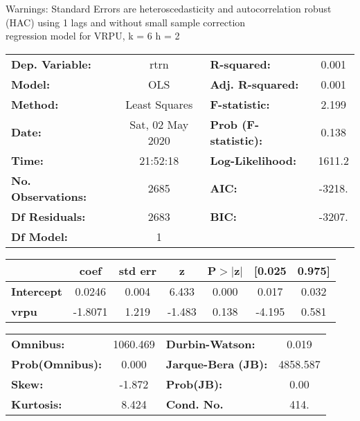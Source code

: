 Warnings: \newline
 [1] Standard Errors are heteroscedasticity and autocorrelation robust (HAC) using 1 lags and without small sample correction\\ 

regression model for VRPU, k = 6 h = 2\begin{center}
\begin{tabular}{lclc}
\toprule
\textbf{Dep. Variable:}    &       rtrn       & \textbf{  R-squared:         } &     0.001   \\
\textbf{Model:}            &       OLS        & \textbf{  Adj. R-squared:    } &     0.001   \\
\textbf{Method:}           &  Least Squares   & \textbf{  F-statistic:       } &     2.199   \\
\textbf{Date:}             & Sat, 02 May 2020 & \textbf{  Prob (F-statistic):} &    0.138    \\
\textbf{Time:}             &     21:52:18     & \textbf{  Log-Likelihood:    } &    1611.2   \\
\textbf{No. Observations:} &        2685      & \textbf{  AIC:               } &    -3218.   \\
\textbf{Df Residuals:}     &        2683      & \textbf{  BIC:               } &    -3207.   \\
\textbf{Df Model:}         &           1      & \textbf{                     } &             \\
\bottomrule
\end{tabular}
\begin{tabular}{lcccccc}
                   & \textbf{coef} & \textbf{std err} & \textbf{z} & \textbf{P$> |$z$|$} & \textbf{[0.025} & \textbf{0.975]}  \\
\midrule
\textbf{Intercept} &       0.0246  &        0.004     &     6.433  &         0.000        &        0.017    &        0.032     \\
\textbf{vrpu}      &      -1.8071  &        1.219     &    -1.483  &         0.138        &       -4.195    &        0.581     \\
\bottomrule
\end{tabular}
\begin{tabular}{lclc}
\textbf{Omnibus:}       & 1060.469 & \textbf{  Durbin-Watson:     } &    0.019  \\
\textbf{Prob(Omnibus):} &   0.000  & \textbf{  Jarque-Bera (JB):  } & 4858.587  \\
\textbf{Skew:}          &  -1.872  & \textbf{  Prob(JB):          } &     0.00  \\
\textbf{Kurtosis:}      &   8.424  & \textbf{  Cond. No.          } &     414.  \\
\bottomrule
\end{tabular}
\end{center}

